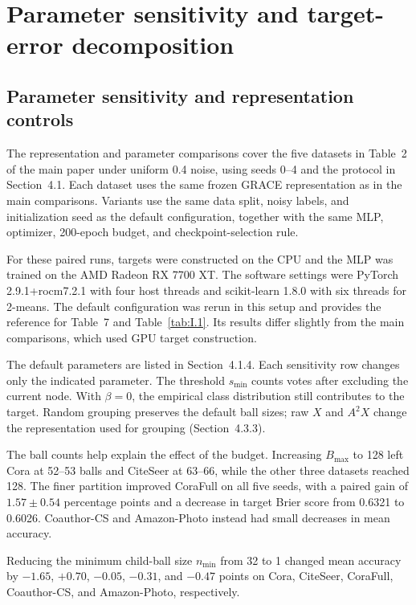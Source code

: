 \FloatBarrier
\setcounter{table}{0}
\section{Parameter sensitivity and target-error decomposition}\label{sec:I}

\subsection{Parameter sensitivity and representation controls}\label{sec:I.1}

The representation and parameter comparisons cover the five datasets in Table~2 of the main paper under uniform 0.4 noise, using seeds 0--4 and the protocol in Section~4.1. Each dataset uses the same frozen GRACE representation as in the main comparisons. Variants use the same data split, noisy labels, and initialization seed as the default configuration, together with the same MLP, optimizer, 200-epoch budget, and checkpoint-selection rule.

For these paired runs, targets were constructed on the CPU and the MLP was trained on the AMD Radeon RX 7700 XT. The software settings were PyTorch 2.9.1+rocm7.2.1 with four host threads and scikit-learn 1.8.0 with six threads for 2-means. The default configuration was rerun in this setup and provides the reference for Table~7 and Table~\ref{tab:I.1}. Its results differ slightly from the main comparisons, which used GPU target construction.

The default parameters are listed in Section~4.1.4. Each sensitivity row changes only the indicated parameter. The threshold \(s_{\min}\) counts votes after excluding the current node. With \(\beta=0\), the empirical class distribution still contributes to the target. Random grouping preserves the default ball sizes; raw \(X\) and \(A^2X\) change the representation used for grouping (Section~4.3.3).



The ball counts help explain the effect of the budget. Increasing \(B_{\max}\) to 128 left Cora at 52--53 balls and CiteSeer at 63--66, while the other three datasets reached 128. The finer partition improved CoraFull on all five seeds, with a paired gain of \(1.57\pm0.54\) percentage points and a decrease in target Brier score from 0.6321 to 0.6026. Coauthor-CS and Amazon-Photo instead had small decreases in mean accuracy.

Reducing the minimum child-ball size \(n_{\min}\) from 32 to 1 changed mean accuracy by \(-1.65\), \(+0.70\), \(-0.05\), \(-0.31\), and \(-0.47\) points on Cora, CiteSeer, CoraFull, Coauthor-CS, and Amazon-Photo, respectively.

